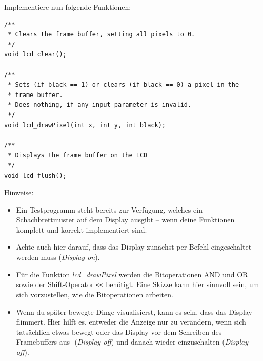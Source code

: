 Implementiere nun folgende Funktionen:
\begin{lstlisting}
/**
 * Clears the frame buffer, setting all pixels to 0.
 */
void lcd_clear();                      

/**
 * Sets (if black == 1) or clears (if black == 0) a pixel in the
 * frame buffer.
 * Does nothing, if any input parameter is invalid.
 */
void lcd_drawPixel(int x, int y, int black);

/**
 * Displays the frame buffer on the LCD
 */
void lcd_flush();
\end{lstlisting}
Hinweise:
\begin{itemize}
\item 
Ein Testprogramm steht bereits zur Verfügung, welches ein Schachbrettmuster auf dem Display ausgibt -- wenn deine Funktionen komplett und korrekt implementiert sind.

\item
Achte auch hier darauf, dass das Display zunächst per Befehl eingeschaltet werden muss (\emph{Display on}).

\item
Für die Funktion \textit{lcd\_drawPixel} werden die Bitoperationen AND und OR sowie der Shift-Operator \verb|<<| benötigt.
Eine Skizze kann hier sinnvoll sein, um sich vorzustellen, wie die Bitoperationen arbeiten.

\item
Wenn du später bewegte Dinge visualisierst, kann es sein, dass das Display flimmert.
Hier hilft es, entweder die Anzeige nur zu verändern, wenn sich tatsächlich etwas bewegt oder das Display vor dem Schreiben des Framebuffers aus- (\emph{Display off}) und danach wieder einzuschalten (\emph{Display off}).
\end{itemize}




